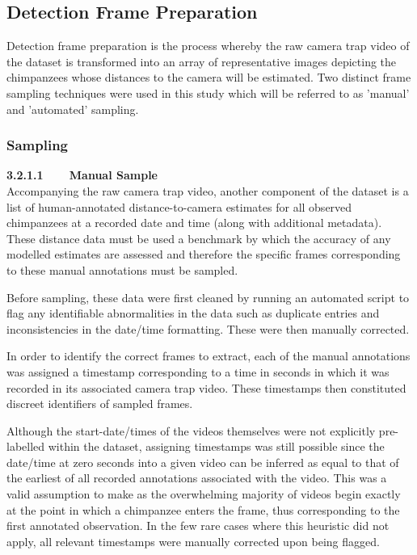 \subsection{Detection Frame Preparation}

Detection frame preparation is the process whereby the raw camera trap video of the dataset
is transformed into an array of representative images depicting the chimpanzees whose
distances to the camera will be estimated.
Two distinct frame sampling techniques were used in this study which will be referred to as
'manual' and 'automated' sampling.

\vspace{-3mm}

\subsubsection{Sampling}\label{subsubsec:sampling}

\textbf{3.2.1.1~~~~Manual Sample}\vspace{4.5mm}\\
Accompanying the raw camera trap video, another component of the dataset is a list of
human-annotated distance-to-camera estimates for all observed chimpanzees at a recorded
date and time (along with additional metadata).
These distance data must be used a benchmark by which the accuracy of any modelled estimates
are assessed and therefore the specific frames corresponding to these manual annotations must
be sampled.

Before sampling, these data were first cleaned by running an automated script to flag any
identifiable abnormalities in the data such as duplicate entries and inconsistencies in the
date/time formatting.
These were then manually corrected.

In order to identify the correct frames to extract, each of the manual annotations was assigned
a timestamp corresponding to a time in seconds in which it was recorded in its associated camera
trap video.
These timestamps then constituted discreet identifiers of sampled frames.

Although the start-date/times of the videos themselves were not explicitly pre-labelled within
the dataset, assigning timestamps was still possible since the date/time at zero seconds into
a given video can be inferred as equal to that of the earliest of all recorded annotations
associated with the video.
This was a valid assumption to make as the overwhelming majority of videos begin exactly at the
point in which a chimpanzee enters the frame, thus corresponding to the first annotated observation.
In the few rare cases where this heuristic did not apply, all relevant timestamps were manually
corrected upon being flagged.

